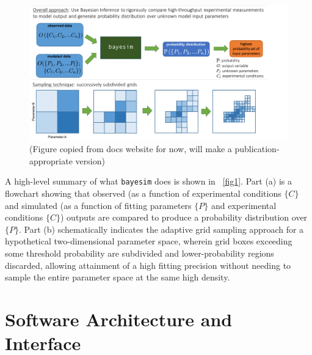 \documentclass[aps,prl,amsmath,amssymb,superscriptaddress,notitlepage,groupedaddress]{revtex4-1}
\begin{document}
 \begin{figure}
   \includegraphics[width=0.7\columnwidth]{figure_1.png}
   \caption{(Figure copied from docs website for now, will make a publication-appropriate version)}
   \label{fig1}
 \end{figure}

 A high-level summary of what \texttt{bayesim} does is shown in ~\autoref{fig1}. Part (a) is a flowchart showing that observed (as a function of experimental conditions $\{C\}$ and simulated (as a function of fitting parameters $\{P\}$ and experimental conditions $\{C\}$) outputs are compared to produce a probability distribution over $\{P\}$. Part (b) schematically indicates the adaptive grid sampling approach for a hypothetical two-dimensional parameter space, wherein grid boxes exceeding some threshold probability are subdivided and lower-probability regions discarded, allowing attainment of a high fitting precision without needing to sample the entire parameter space at the same high density.

\section*{Software Architecture and Interface}
\end{document}
